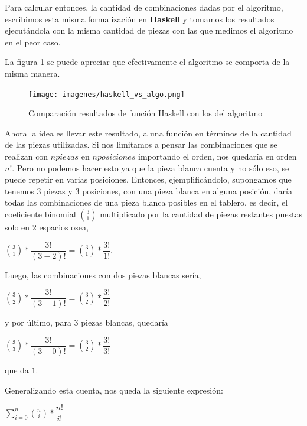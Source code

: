 \documentclass[11pt,a4paper]{article}
\begin{document}
Para calcular entonces, la cantidad de combinaciones dadas por el algoritmo, escribimos esta misma formalización en \textbf{Haskell} y tomamos los resultados ejecutándola con la misma cantidad de piezas con las que medimos el algoritmo en el peor caso.

La figura \ref{fig:haskell_vs_algo} se puede apreciar que efectivamente el algoritmo se comporta de la misma manera.

	\begin{figure}[H]
    	\begin{center}
        	\texttt{[image: imagenes/haskell\_vs\_algo.png]}
    	\end{center}
    	\caption{Comparación resultados de función Haskell con los del algoritmo}
    	\label{fig:haskell_vs_algo}
	\end{figure}

Ahora la idea es llevar este resultado, a una función en términos de la cantidad de las piezas utilizadas. Si nos limitamos a pensar las combinaciones que se realizan con $n piezas$ en $n posiciones$ importando el orden, nos quedaría en orden $n!$. Pero no podemos hacer esto ya que la pieza blanca cuenta y no sólo eso, se puede repetir en varias posiciones. Entonces, ejemplificándolo, supongamos que tenemos 3 piezas y 3 posiciones, con una pieza blanca en alguna posición, daría todas las combinaciones de una pieza blanca posibles en el tablero, es decir, el coeficiente binomial 
$\binom  {3} {1}$ multiplicado por la cantidad de piezas restantes puestas solo en 2 espacios osea, 
\begin{center}
$\binom  {3} {1} * \dfrac{3!}{(3 - 2)!} = \binom  {3} {1} * \dfrac{3!}{1!}$.
\end{center}

Luego, las combinaciones con dos piezas blancas sería, 
\begin{center}
$\binom  {3} {2} * \dfrac{3!}{(3 - 1)!} = \binom  {3} {2} * \dfrac{3!}{2!}$
\end{center}

y por último, para 3 piezas blancas, quedaría
\begin{center}
$\binom  {3} {3} * \dfrac{3!}{(3 - 0)!} = \binom  {3} {2} * \dfrac{3!}{3!}$
\end{center}

que da $1$.

Generalizando esta cuenta, nos queda la siguiente expresión:

\begin{center}

$\sum_{i=0}^{n}\binom  {n} {i} * \dfrac{n!}{i!}$

\end{center}
\end{document}
